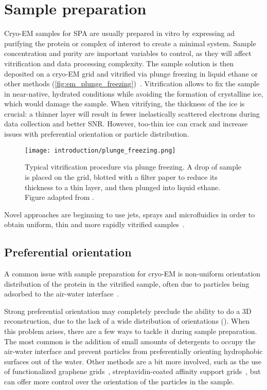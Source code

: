 \section{Sample preparation}
Cryo-EM samples for SPA are usually prepared in vitro by expressing ad purifying the protein or complex of interest to create a minimal system.
Sample concentration and purity are important variables to control, as they will affect vitrification and data processing complexity.
The sample solution is then deposited on a cryo-EM grid and vitrified via plunge freezing in liquid ethane or other methods (\autoref{fig:em_plunge_freezing})~\cite{dubochetCryoelectronMicroscopyVitrified1988}.
Vitrification allows to fix the sample in near-native, hydrated conditions while avoiding the formation of crystalline ice, which would damage the sample.
When vitrifying, the thickness of the ice is crucial: a thinner layer will result in fewer inelastically scattered electrons during data collection and better SNR.
However, too-thin ice can crack and increase issues with preferential orientation or particle distribution.

\begin{figure}[ht]
    \centering
    \texttt{[image: introduction/plunge\_freezing.png]}
    \caption[Vitrification via plunge freezing]{Typical vitrification procedure via plunge freezing. A drop of sample is placed on the grid, blotted with a filter paper to reduce its thickness to a thin layer, and then plunged into liquid ethane. Figure adapted from \citet{chungNobelPrizeChemistry2017}.}
    \label{fig:em_plunge_freezing}
\end{figure}

Novel approaches are beginning to use jets, sprays and microfluidics in order to obtain uniform, thin and more rapidly vitrified samples~\cite{geminEasyGridVersatilePlatform2024}.

\subsection{Preferential orientation}
A common issue with sample preparation for cryo-EM is non-uniform orientation distribution of the protein in the vitrified sample, often due to particles being adsorbed to the air-water interface~\cite{nobleRoutineSingleParticle2018}.

Strong preferential orientation may completely preclude the ability to do a 3D reconstruction, due to the lack of a wide distribution of orientations ().
When this problem arises, there are a few ways to tackle it during sample preparation.
The most common is the addition of small amounts of detergents to occupy the air-water interface and prevent particles from preferentially orienting hydrophobic surfaces out of the water.
Other methods are a bit more involved, such as the use of functionalized graphene grids~\cite{luFunctionalizedGrapheneGrids2022}, streptavidin-coated affinity support grids~\cite{crucifixImmobilizationBiotinylatedDNA2004,hanLongShelflifeStreptavidin2016}, but can offer more control over the orientation of the particles in the sample.

